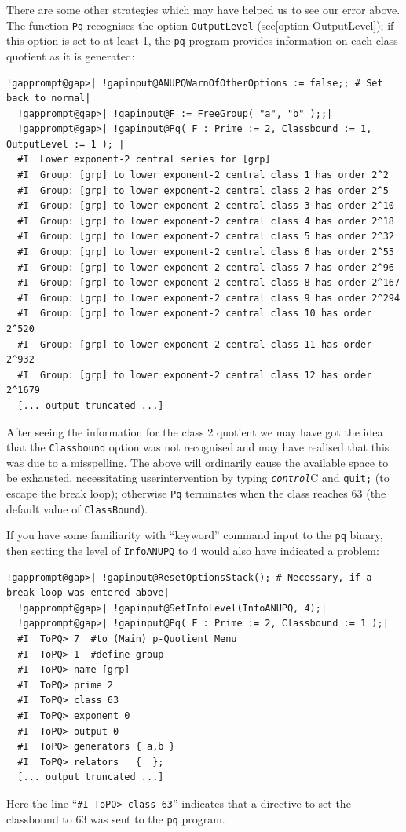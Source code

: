 \documentclass[a4paper,11pt]{report}
\begin{document}
{{ There are some other strategies which may have helped us to see our error
above. The function \texttt{Pq} recognises the option \texttt{OutputLevel} (see{\nobreakspace}\ref{option OutputLevel}); if this option is set to at least 1, the \texttt{pq} program provides information on each class quotient as it is generated: 
\begin{Verbatim}[commandchars=!@|,fontsize=\small,frame=single,label=Example]
  !gapprompt@gap>| !gapinput@ANUPQWarnOfOtherOptions := false;; # Set back to normal|
  !gapprompt@gap>| !gapinput@F := FreeGroup( "a", "b" );;|
  !gapprompt@gap>| !gapinput@Pq( F : Prime := 2, Classbound := 1, OutputLevel := 1 ); |
  #I  Lower exponent-2 central series for [grp]
  #I  Group: [grp] to lower exponent-2 central class 1 has order 2^2
  #I  Group: [grp] to lower exponent-2 central class 2 has order 2^5
  #I  Group: [grp] to lower exponent-2 central class 3 has order 2^10
  #I  Group: [grp] to lower exponent-2 central class 4 has order 2^18
  #I  Group: [grp] to lower exponent-2 central class 5 has order 2^32
  #I  Group: [grp] to lower exponent-2 central class 6 has order 2^55
  #I  Group: [grp] to lower exponent-2 central class 7 has order 2^96
  #I  Group: [grp] to lower exponent-2 central class 8 has order 2^167
  #I  Group: [grp] to lower exponent-2 central class 9 has order 2^294
  #I  Group: [grp] to lower exponent-2 central class 10 has order 2^520
  #I  Group: [grp] to lower exponent-2 central class 11 has order 2^932
  #I  Group: [grp] to lower exponent-2 central class 12 has order 2^1679
  [... output truncated ...]
\end{Verbatim}
 After seeing the information for the class 2 quotient we may have got the idea
that the \texttt{Classbound} option was not recognised and may have realised that this was due to a
mis\texttt{}spelling. The above will ordinarily cause the available
space to be exhausted, necessitating user\texttt{}intervention by
typing \mbox{\texttt{\mdseries\slshape control}}\texttt{}C and \texttt{quit;} (to escape the break loop); otherwise \texttt{Pq} terminates when the class reaches 63 (the default value of \texttt{ClassBound}). 

 If you have some familiarity with ``keyword'' command input to the \texttt{pq} binary, then setting the level of \texttt{InfoANUPQ} to 4 would also have indicated a problem: 
\begin{Verbatim}[commandchars=!@|,fontsize=\small,frame=single,label=Example]
  !gapprompt@gap>| !gapinput@ResetOptionsStack(); # Necessary, if a break-loop was entered above|
  !gapprompt@gap>| !gapinput@SetInfoLevel(InfoANUPQ, 4);|
  !gapprompt@gap>| !gapinput@Pq( F : Prime := 2, Classbound := 1 );|
  #I  ToPQ> 7  #to (Main) p-Quotient Menu
  #I  ToPQ> 1  #define group
  #I  ToPQ> name [grp]
  #I  ToPQ> prime 2
  #I  ToPQ> class 63
  #I  ToPQ> exponent 0
  #I  ToPQ> output 0
  #I  ToPQ> generators { a,b }
  #I  ToPQ> relators   {  };
  [... output truncated ...]
\end{Verbatim}
 Here the line ``\texttt{\#I ToPQ{\textgreater} class 63}'' indicates that a directive to set the classbound to 63 was sent to the \texttt{pq} program. }

 }
\end{document}
